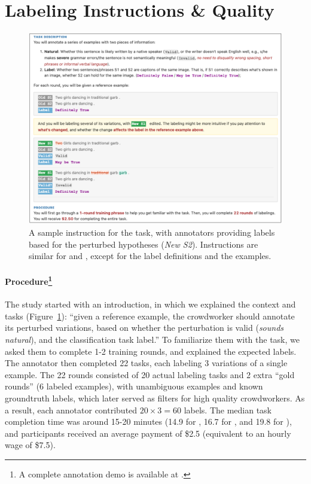 \section{Labeling Instructions \& Quality}
\label{appendix:label_instruct}


\begin{figure}
\centering
\includegraphics[width=1\textwidth]{figures/mturk_instruction.pdf}
\vspace{-15pt}
\caption{A sample instruction for the \nli task, with annotators providing labels based for the perturbed hypotheses (\emph{New S2}). Instructions are similar for \qqp and \sst, except for the label definitions and the examples. }
\vspace{-10pt}
\label{fig:mturk_instruction_detail}
\end{figure}

\paragraph{Procedure\footnote{A complete annotation demo is available at \mturkurl.}}
The study started with an introduction, in which we explained the context and tasks (Figure~\ref{fig:mturk_instruction_detail}): 
``given a reference example, the crowdworker should annotate its perturbed variations, based on whether the perturbation is valid (\emph{sounds natural}), and the classification task label.''
To familiarize them with the task, we asked them to complete 1-2 training rounds, and explained the expected labels.
The annotator then completed 22 tasks, each labeling 3 variations of a single example.
The 22 rounds consisted of 20 actual labeling tasks and 2 extra ``gold rounds'' (6 labeled examples), with unambiguous examples and known groundtruth labels, which later served as filters for high quality crowdworkers.
As a result, each annotator contributed $20 \times 3=60$ labels.
The median task completion time was around 15-20 minutes (14.9 for \qqp, 16.7 for \sst, and 19.8 for \nli), and participants received an average payment of \$2.5 (equivalent to an hourly wage of \$7.5).

